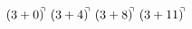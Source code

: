 \documentclass[preview]{standalone}
\begin{document}
\begin{align*}
(3+0)^{\hspace{-0.1cm}\urcorner} \ (3+4)^{\hspace{-0.1cm}\urcorner} \ (3+8)^{\hspace{-0.1cm}\urcorner} \ (3+11)^{\hspace{-0.1cm}\urcorner}
\end{align*}
\end{document}
